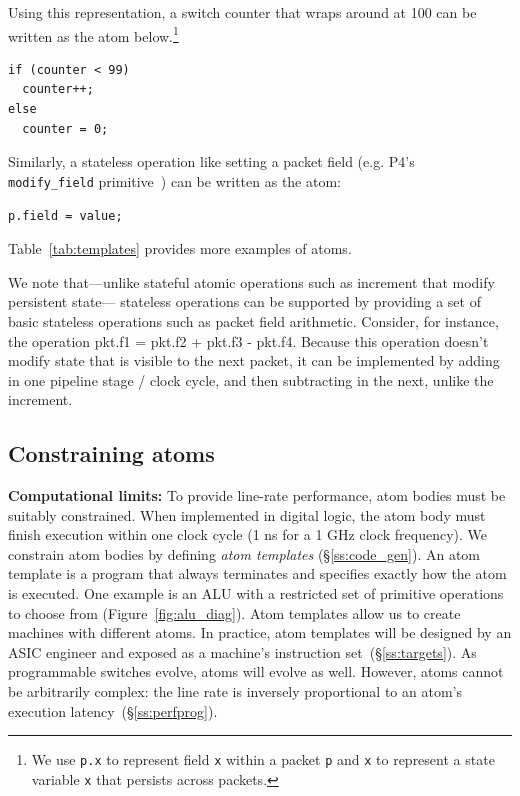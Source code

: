 Using this representation, a switch counter that wraps around at 100
can be written as the atom below.\footnote{We use {\tt p.x} to
  represent field {\tt x} within a packet {\tt p} and {\tt x} to
  represent a state variable {\tt x} that persists across packets.}
\begin{lstlisting}[style=customc, numbers=none, frame=none]
if (counter < 99)
  counter++;
else
  counter = 0;
\end{lstlisting}
Similarly, a stateless operation like setting a packet field (e.g. P4's {\tt
modify\_field} primitive~\cite{p4spec}) can be written as the atom:
\begin{lstlisting}[style=customc, numbers=none, frame=none]
  p.field = value;
\end{lstlisting}
Table~\ref{tab:templates} provides more examples of atoms.

We note that---unlike stateful atomic operations such as increment
that modify persistent state--- stateless operations can be supported
by providing a set of basic stateless operations such as packet field
arithmetic. Consider, for instance, the operation pkt.f1 = pkt.f2 +
pkt.f3 - pkt.f4. Because this operation doesn't modify state that is
visible to the next packet, it can be implemented by adding in one
pipeline stage / clock cycle, and then subtracting in the next, unlike the increment.
\subsection{Constraining atoms}
\label{s:atomConstraints}

\textbf{Computational limits:}
To provide line-rate performance, atom bodies must be suitably
constrained.  When implemented in digital logic, the atom body must
finish execution within one clock cycle (1 ns for a 1 GHz clock
frequency). We constrain atom bodies by defining {\it atom templates}
(\S\ref{ss:code_gen}).  An atom template is a program that always
terminates and specifies exactly how the atom is executed. One example
is an ALU with a restricted set of primitive operations to choose from
(Figure~\ref{fig:alu_diag}). Atom templates allow us to create
\absmachine machines with different atoms.  In practice, atom
templates will be designed by an ASIC engineer and exposed as a
machine's instruction set~(\S\ref{ss:targets}).  As programmable
switches evolve, atoms will evolve as well.  However, atoms cannot be
arbitrarily complex: the line rate is inversely proportional to an
atom's execution latency~(\S\ref{ss:perfprog}).

